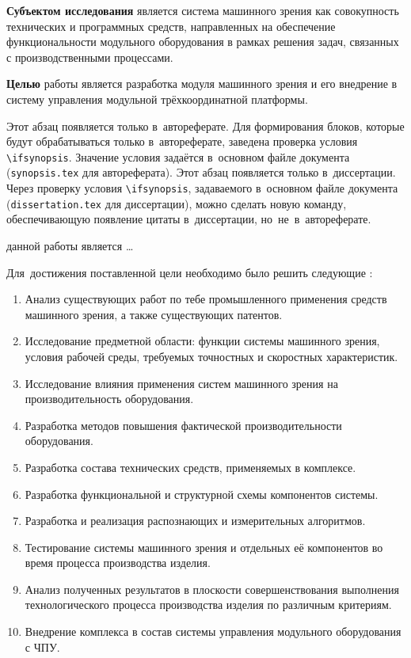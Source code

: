 \textbf{Субъектом исследования} является система машинного зрения как совокупность технических и программных средств, направленных на обеспечение функциональности модульного оборудования в рамках решения задач, связанных с производственными процессами.

\textbf{Целью} работы является разработка модуля машинного зрения и его внедрение в систему управления модульной трёхкоординатной платформы.

\ifsynopsis
Этот абзац появляется только в~автореферате.
Для формирования блоков, которые будут обрабатываться только в~автореферате,
заведена проверка условия \verb!\!\verb!ifsynopsis!.
Значение условия задаётся в~основном файле документа (\verb!synopsis.tex! для
автореферата).
\else
Этот абзац появляется только в~диссертации.
Через проверку условия \verb!\!\verb!ifsynopsis!, задаваемого в~основном файле
документа (\verb!dissertation.tex! для диссертации), можно сделать новую
команду, обеспечивающую появление цитаты в~диссертации, но~не~в~автореферате.
\fi


{\aim} данной работы является \ldots

Для~достижения поставленной цели необходимо было решить следующие {\tasks}:
\begin{enumerate}[beginpenalty=10000] %
 \item Анализ существующих работ по тебе промышленного применения средств машинного зрения, а также существующих патентов.
 \item Исследование предметной области: функции системы машинного зрения, условия рабочей среды, требуемых точностных и скоростных характеристик.
 \item Исследование влияния применения систем машинного зрения на производительность оборудования.
 \item Разработка методов повышения фактической производительности оборудования.
 \item Разработка состава технических средств, применяемых в комплексе.
 \item Разработка функциональной и структурной схемы компонентов системы.
 \item Разработка и реализация распознающих и измерительных алгоритмов.
 \item Тестирование системы машинного зрения и отдельных её компонентов во время процесса производства изделия.
 \item Анализ полученных результатов в плоскости совершенствования выполнения технологического процесса производства изделия по различным критериям.
 \item Внедрение комплекса в состав системы управления модульного оборудования с ЧПУ.
\end{enumerate}

